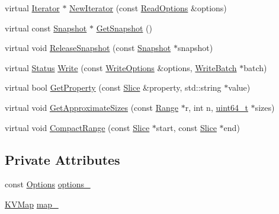 \begin{DoxyCompactItemize}
\item 
virtual \hyperlink{classleveldb_1_1_iterator}{Iterator} $\ast$ \hyperlink{classleveldb_1_1_model_d_b_a5acf23bae313f2e2f3ea9f0ab95450cf}{New\+Iterator} (const \hyperlink{structleveldb_1_1_read_options}{Read\+Options} \&options)
\item 
virtual const \hyperlink{classleveldb_1_1_snapshot}{Snapshot} $\ast$ \hyperlink{classleveldb_1_1_model_d_b_aa82849af6a149d122e65a4aac412903f}{Get\+Snapshot} ()
\item 
virtual void \hyperlink{classleveldb_1_1_model_d_b_a3f5d86ce612baaa88c11601c9a59df12}{Release\+Snapshot} (const \hyperlink{classleveldb_1_1_snapshot}{Snapshot} $\ast$snapshot)
\item 
virtual \hyperlink{classleveldb_1_1_status}{Status} \hyperlink{classleveldb_1_1_model_d_b_ae3a20d2fc971376349b142b9c2d159be}{Write} (const \hyperlink{structleveldb_1_1_write_options}{Write\+Options} \&options, \hyperlink{classleveldb_1_1_write_batch}{Write\+Batch} $\ast$batch)
\item 
virtual bool \hyperlink{classleveldb_1_1_model_d_b_a5c83a50a08e45c2564c39a650ea55b86}{Get\+Property} (const \hyperlink{classleveldb_1_1_slice}{Slice} \&property, std\+::string $\ast$value)
\item 
virtual void \hyperlink{classleveldb_1_1_model_d_b_aeb5502077fae602c5ca3c1153f29b693}{Get\+Approximate\+Sizes} (const \hyperlink{structleveldb_1_1_range}{Range} $\ast$r, int n, \hyperlink{stdint_8h_aaa5d1cd013383c889537491c3cfd9aad}{uint64\+\_\+t} $\ast$sizes)
\item 
virtual void \hyperlink{classleveldb_1_1_model_d_b_a7a04a6e5227079f861c26b920df6b833}{Compact\+Range} (const \hyperlink{classleveldb_1_1_slice}{Slice} $\ast$start, const \hyperlink{classleveldb_1_1_slice}{Slice} $\ast$end)
\end{DoxyCompactItemize}
\subsection*{Private Attributes}
\begin{DoxyCompactItemize}
\item 
const \hyperlink{structleveldb_1_1_options}{Options} \hyperlink{classleveldb_1_1_model_d_b_ae5aee6801bcd1c2d8843607abb2e723a}{options\+\_\+}
\item 
\hyperlink{namespaceleveldb_aac1e50450147be263e08252c6700f7a7}{K\+V\+Map} \hyperlink{classleveldb_1_1_model_d_b_ada58b7989a2d120b45f5fed2e4391c65}{map\+\_\+}
\end{DoxyCompactItemize}
